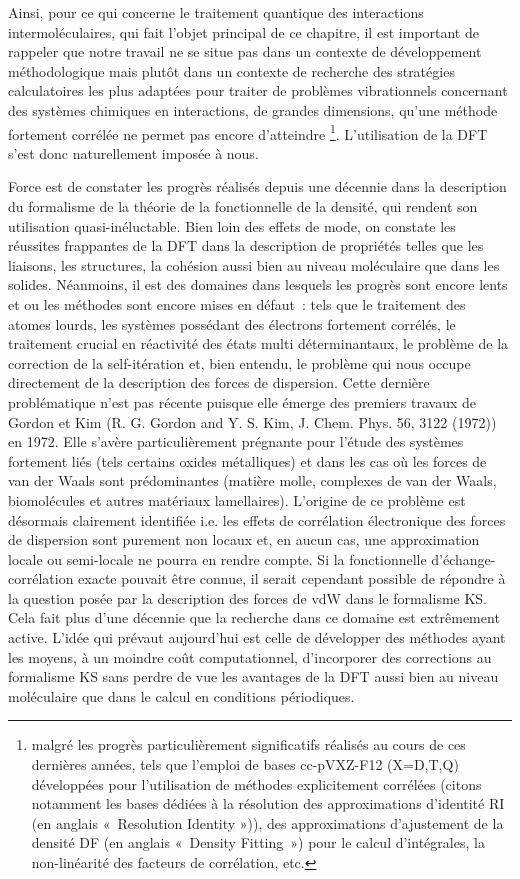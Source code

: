 Ainsi, pour ce qui concerne le traitement quantique des interactions intermoléculaires, qui fait l’objet principal de ce chapitre, il est important de rappeler que notre travail ne se situe pas dans un contexte de développement méthodologique mais plutôt dans un contexte de recherche des stratégies calculatoires les plus adaptées pour traiter de problèmes vibrationnels concernant des systèmes chimiques en interactions, de grandes dimensions, qu’une méthode fortement corrélée ne permet pas encore d’atteindre \footnote{malgré les progrès particulièrement significatifs réalisés au cours de ces dernières années, tels que l’emploi de bases cc-pVXZ-F12 (X=D,T,Q) développées pour l’utilisation de méthodes explicitement corrélées (citons notamment les bases dédiées à la résolution des approximations d'identité RI (en anglais « Resolution Identity »)), des approximations d'ajustement de la densité DF (en anglais « Density Fitting ») pour le calcul d’intégrales, la non-linéarité des facteurs de corrélation, etc.}. L’utilisation de la DFT s’est donc naturellement imposée à nous.

Force est de constater les progrès réalisés depuis une décennie dans la description du formalisme de la théorie de la fonctionnelle de la densité, qui rendent son utilisation quasi-inéluctable. Bien loin des effets de mode, on constate les réussites frappantes de la DFT dans la description de propriétés telles que les liaisons, les structures, la cohésion aussi bien au niveau moléculaire que dans les solides. Néanmoins, il est des domaines dans lesquels les progrès sont encore lents et ou les méthodes sont encore mises en défaut : tels que le traitement des atomes lourds, les systèmes possédant des électrons fortement corrélés, le traitement crucial en réactivité des états multi déterminantaux, le problème de la correction de la self-itération et, bien entendu, le problème qui nous occupe directement de la description des forces de dispersion. Cette dernière problématique n’est pas récente puisque elle émerge des premiers travaux de Gordon et Kim (R. G. Gordon and Y. S. Kim, J. Chem. Phys. 56, 3122 (1972)) en 1972. Elle s’avère particulièrement prégnante pour l’étude des systèmes fortement liés (tels certains oxides métalliques) et dans les cas où les forces de van der Waals sont prédominantes (matière molle, complexes de van der Waals, biomolécules et autres matériaux lamellaires). L’origine de ce problème est désormais clairement identifiée i.e. les effets de corrélation électronique des forces de dispersion sont purement non locaux et, en aucun cas, une approximation locale ou semi-locale ne pourra en rendre compte. Si la fonctionnelle d’échange-corrélation exacte pouvait être connue, il serait cependant possible de répondre à la question posée par la description des forces de vdW dans le formalisme KS. Cela fait plus d’une décennie que la recherche dans ce domaine est extrêmement active. L’idée qui prévaut aujourd’hui est celle de développer des méthodes ayant les moyens, à un moindre coût computationnel, d’incorporer des corrections au formalisme KS sans perdre de vue les avantages de la DFT aussi bien au niveau moléculaire que dans le calcul en conditions périodiques. 

